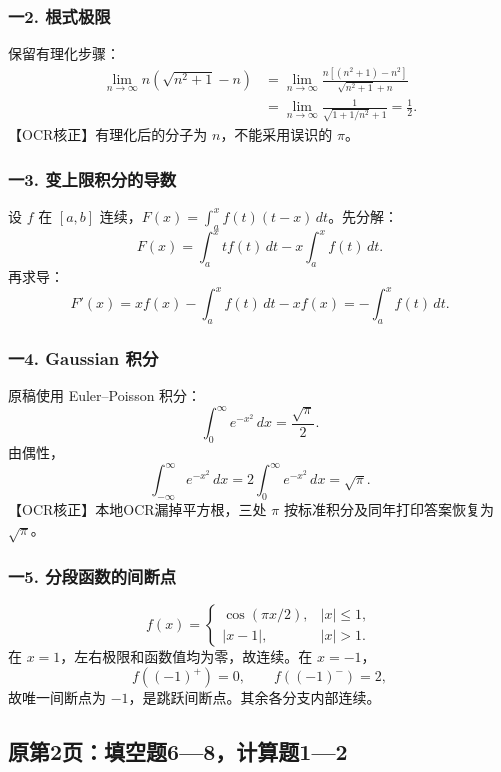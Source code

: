 \documentclass[11pt,fontset=fandol]{ctexart}
\begin{document}
\subsubsection{一2. 根式极限}\label{ux4e002.-ux6839ux5f0fux6781ux9650}

保留有理化步骤： \[
\begin{aligned}
\lim_{n\to\infty}n(\sqrt{n^2+1}-n)
&=\lim_{n\to\infty}\frac{n[(n^2+1)-n^2]}{\sqrt{n^2+1}+n}\\
&=\lim_{n\to\infty}\frac1{\sqrt{1+1/n^2}+1}=\frac12.
\end{aligned}
\] 【OCR核正】有理化后的分子为 \(n\)，不能采用误识的 \(\pi\)。

\subsubsection{一3.
变上限积分的导数}\label{ux4e003.-ux53d8ux4e0aux9650ux79efux5206ux7684ux5bfcux6570}

设 \(f\) 在 \([a,b]\) 连续，\(F(x)=\int_a^x f(t)(t-x)\,dt\)。先分解： \[
F(x)=\int_a^x tf(t)\,dt-x\int_a^xf(t)\,dt.
\] 再求导： \[
F'(x)=xf(x)-\int_a^xf(t)\,dt-xf(x)=-\int_a^xf(t)\,dt.
\]

\subsubsection{一4. Gaussian 积分}\label{ux4e004.-gaussian-ux79efux5206}

原稿使用 Euler--Poisson 积分： \[
\int_0^\infty e^{-x^2}\,dx=\frac{\sqrt\pi}{2}.
\] 由偶性， \[
\int_{-\infty}^\infty e^{-x^2}\,dx
=2\int_0^\infty e^{-x^2}\,dx=\sqrt\pi.
\] 【OCR核正】本地OCR漏掉平方根，三处 \(\pi\)
按标准积分及同年打印答案恢复为 \(\sqrt\pi\)。

\subsubsection{一5.
分段函数的间断点}\label{ux4e005.-ux5206ux6bb5ux51fdux6570ux7684ux95f4ux65adux70b9}

\[
f(x)=\begin{cases}\cos(\pi x/2),&|x|\le1,\\|x-1|,&|x|>1.\end{cases}
\] 在 \(x=1\)，左右极限和函数值均为零，故连续。在 \(x=-1\)， \[
f((-1)^+)=0,\qquad f((-1)^-)=2,
\] 故唯一间断点为 \(-1\)，是跳跃间断点。其余各分支内部连续。

\subsection{原第2页：填空题6---8，计算题1---2}\label{ux539fux7b2c2ux9875ux586bux7a7aux989868ux8ba1ux7b97ux989812}
\end{document}
